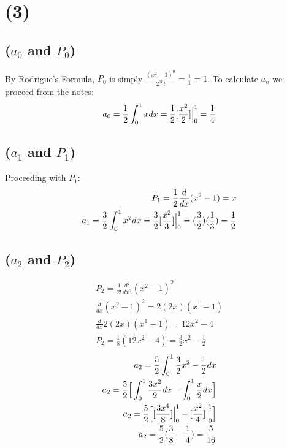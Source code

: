 \documentclass{article}
\begin{document}
\section*{\textbf{(3)}}
\subsection*{\textbf{($a_0$ and $P_0$)}}
By Rodrigue's Formula, $P_0$ is simply $\frac{(x^2-1)^0}{2^00!} = \frac{1}{1} = 1$. To calculate $a_n$ we proceed from the notes:
\begin{equation}
\begin{aligned}
a_0 = \frac{1}{2}\int_0^1xdx = \frac{1}{2}[\frac{x^2}{2}]\Big{|}^1_0 = \frac{1}{4}
\end{aligned}
\end{equation}
\subsection*{\textbf{($a_1$ and $P_1$)}}
Proceeding with $P_1$:
\begin{equation}
\begin{aligned}
P_1 = \frac{1}{2}\frac{d}{dx}(x^2-1) = x\\
a_1 = \frac{3}{2}\int_0^1x^2dx = \frac{3}{2}[\frac{x^2}{3}]\Big{|}^1_0 = (\frac{3}{2})(\frac{1}{3}) = \frac{1}{2}
\end{aligned}
\end{equation}
\subsection*{\textbf{($a_2$ and $P_2$)}}
\begin{equation}
\begin{aligned}
P_2 = \frac{1}{2!}\frac{d^2}{dx^2}(x^2-1)^2\\
\frac{d}{dx}(x^2-1)^2 = 2(2x)(x^1-1) \\
\frac{d}{dx}2(2x)(x^1-1) = 12x^2-4\\
P_2 = \frac{1}{8}(12x^2-4) = \frac{3}{2}x^2 - \frac{1}{2}
\end{aligned}
\end{equation}
\begin{equation}
\begin{aligned}
a_2 = \frac{5}{2}\int_0^1\frac{3}{2}x^2 - \frac{1}{2}dx\\
a_2 = \frac{5}{2}\Big{[}\int_0^1\frac{3x^2}{2}dx - \int_0^1\frac{x}{2}dx \Big{]}\\
a_2 = \frac{5}{2}\Big{[}[\frac{3x^4}{8}]\Big{|}_0^1 - [\frac{x^2}{4}]\Big{|}_0^1 \Big{]}\\
a_2 = \frac{5}{2} (\frac{3}{8} - \frac{1}{4}) = \frac{5}{16}
\end{aligned}
\end{equation}
\end{document}

